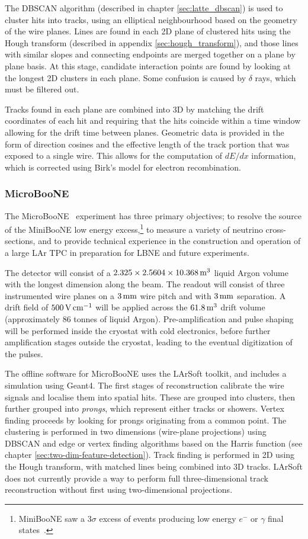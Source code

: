 The DBSCAN algorithm (described in chapter \ref{sec:latte_dbscan}) is used to cluster hits into tracks, using an elliptical neighbourhood based on the geometry of the wire planes. Lines are found in each 2D plane of clustered hits using the Hough transform (described in appendix \ref{sec:hough_transform}), and those lines with similar slopes and connecting endpoints are merged together on a plane by plane basis. At this stage, candidate interaction points are found by looking at the longest 2D clusters in each plane. Some confusion is caused by $\delta$ rays, which must be filtered out.

Tracks found in each plane are combined into 3D by matching the drift coordinates of each hit and requiring that the hits coincide within a time window allowing for the drift time between planes. Geometric data is provided in the form of direction cosines and the effective length of the track portion that was exposed to a single wire. This allows for the computation of $dE/dx$ information, which is corrected using Birk's model for electron recombination.

\subsubsection{MicroBooNE}
The MicroBooNE~\citep{MicroBooNE} experiment has three primary objectives; to resolve the source of the MiniBooNE low energy excess,\footnote{MiniBooNE saw a $3\sigma$ excess of events producing low energy $e^-$ or $\gamma$ final states~\citep{MiniBooNE}.} to measure a variety of neutrino cross-sections, and to provide technical experience in the construction and operation of a large \acs{LAr TPC} in preparation for LBNE and future experiments.

The detector will consist of a $2.325\times 2.5604 \times 10.368 \metre^3$ liquid Argon volume with the longest dimension along the beam. The readout will consist of three instrumented wire planes on a $3\mm$ wire pitch and with $3\mm$ separation. A drift field of $500\volt\cm^{-1}$ will be applied across the $61.8\metre^3$ drift volume (approximately $86$ tonnes of liquid Argon). Pre-amplification and pulse shaping will be performed inside the cryostat with cold electronics, before further amplification stages outside the cryostat, leading to the eventual digitization of the pulses.

The offline software for MicroBooNE uses the LArSoft toolkit, and includes a simulation using Geant4. The first stages of reconstruction calibrate the wire signals and localise them into spatial hits. These are grouped into clusters, then further grouped into \emph{prongs}, which represent either tracks or showers. Vertex finding proceeds by looking for prongs originating from a common point. The clustering is performed in two dimensions (wire-plane projections) using DBSCAN and edge or vertex finding algorithms based on the Harris function (see chapter \ref{sec:two-dim-feature-detection}). Track finding is performed in 2D using the Hough transform, with matched lines being combined into 3D tracks. LArSoft does not currently provide a way to perform full three-dimensional track reconstruction without first using two-dimensional projections.

